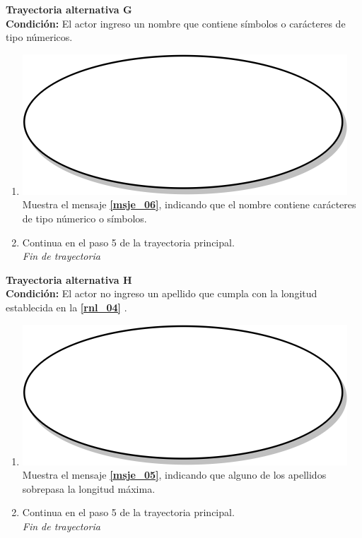 \textbf{Trayectoria alternativa G} \label{cu2_ta_g}\\
\textbf{Condición:} El actor ingreso un nombre que contiene símbolos o carácteres de tipo númericos.\\
 \begin{enumerate}[label=G\arabic*]
    \item {\includegraphics[scale=.05]{Capitulo3/img/proceso.png} Muestra el mensaje \textbf{\ref{msje_06}}, indicando que el nombre contiene carácteres de tipo númerico o símbolos.}
    \item {Continua en el paso 5 de la trayectoria principal.} \\
    \textit{Fin de trayectoria} \\
\end{enumerate}

\textbf{Trayectoria alternativa H} \label{cu2_ta_h}\\
\textbf{Condición:} El actor no ingreso un apellido que cumpla con la longitud establecida en la \textbf{\ref{rnl_04}} .\\
 \begin{enumerate}[label=H\arabic*]
    \item {\includegraphics[scale=.05]{Capitulo3/img/proceso.png} Muestra el mensaje \textbf{\ref{msje_05}}, indicando que alguno de los apellidos sobrepasa la longitud máxima.}
    \item {Continua en el paso 5 de la trayectoria principal.} \\
    \textit{Fin de trayectoria} \\
\end{enumerate}

